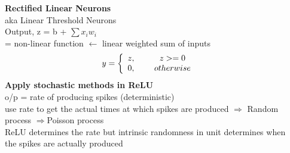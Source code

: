 \documentclass{beamer}
\begin{document}
\begin{frame}[allowframebreaks]
\begin{columns}
\begin{column}{0.35\textwidth}
		\end{column}
		\begin{column}{0.65\textwidth}
			\textbf{Rectified Linear Neurons}\\
			aka Linear Threshold Neurons\\
			Output, z = b + $\sum x_i w_i$\\
			= non-linear function $\leftarrow$ linear weighted sum of inputs 	
			\begin{align}
			y = \left\{ \begin{array}{cc} 
			z, & \hspace{5mm} z >=0 \\
			0, & \hspace{5mm} otherwise \\
			\end{array} \right.
			\end{align}
			\textbf{Apply stochastic methods in ReLU}\\
			o/p = rate of producing spikes (deterministic)\\
			use rate to get the actual times at which spikes are produced $\Rightarrow$ Random process $\Rightarrow$Poisson process\\
			ReLU determines the rate but intrinsic randomness in unit determines when the spikes are actually produced
		\end{column}
	\end{columns}





\end{frame}
\end{document}

